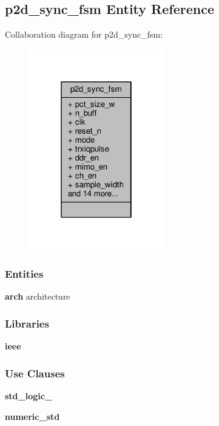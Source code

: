 \subsection{p2d\+\_\+sync\+\_\+fsm Entity Reference}
\label{classp2d__sync__fsm}


Collaboration diagram for p2d\+\_\+sync\+\_\+fsm\+:\nopagebreak
\begin{figure}[H]
\begin{center}
\leavevmode
\includegraphics[width=166pt]{d9/da5/classp2d__sync__fsm__coll__graph}
\end{center}
\end{figure}
\subsubsection*{Entities}
\begin{DoxyCompactItemize}
\item 
{\bf arch} architecture
\end{DoxyCompactItemize}
\subsubsection*{Libraries}
 \begin{DoxyCompactItemize}
\item 
{\bf ieee} 
\end{DoxyCompactItemize}
\subsubsection*{Use Clauses}
 \begin{DoxyCompactItemize}
\item 
{\bf std\+\_\+logic\+\_}   
\item 
{\bf numeric\+\_\+std}   
\end{DoxyCompactItemize}
